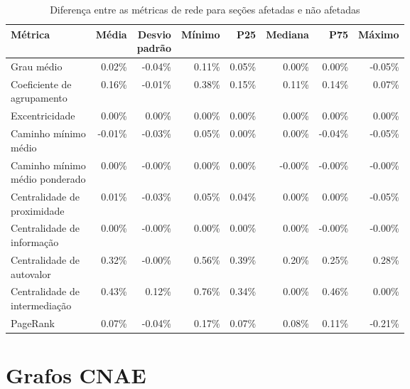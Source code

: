 \begin{table}[htb]
\centering
\caption{Diferença entre as métricas de rede para seções afetadas e não afetadas}
\label{tab:metricas-redes-pandemia:diferenca-afetadas-por-secao}
\begin{tabular}{l|rrrrrrr}
\toprule
Métrica & Média & \shortstack{Desvio\\padrão} & Mínimo & P25 & Mediana & P75 & Máximo \\
\midrule
Grau médio                     &  0.02\% & -0.04\% & 0.11\% & 0.05\% &  0.00\% &  0.00\% & -0.05\% \\ \hline
\shortstack[l]{Coeficiente de\\agrupamento}     &  0.16\% & -0.01\% & 0.38\% & 0.15\% &  0.11\% &  0.14\% &  0.07\% \\ \hline
Excentricidade                 &  0.00\% &  0.00\% & 0.00\% & 0.00\% &  0.00\% &  0.00\% &  0.00\% \\ \hline
\shortstack[l]{Caminho mínimo\\médio}           & -0.01\% & -0.03\% & 0.05\% & 0.00\% &  0.00\% & -0.04\% & -0.05\% \\ \hline
\shortstack[l]{Caminho mínimo\\médio ponderado} &  0.00\% & -0.00\% & 0.00\% & 0.00\% & -0.00\% & -0.00\% & -0.00\% \\ \hline
\shortstack[l]{Centralidade de\\proximidade}    &  0.01\% & -0.03\% & 0.05\% & 0.04\% &  0.00\% &  0.00\% & -0.05\% \\ \hline
\shortstack[l]{Centralidade de\\informação}     &  0.00\% & -0.00\% & 0.00\% & 0.00\% &  0.00\% & -0.00\% & -0.00\% \\ \hline
\shortstack[l]{Centralidade de\\autovalor}      &  0.32\% & -0.00\% & 0.56\% & 0.39\% &  0.20\% &  0.25\% &  0.28\% \\ \hline
\shortstack[l]{Centralidade de\\intermediação}  &  0.43\% &  0.12\% & 0.76\% & 0.34\% &  0.00\% &  0.46\% &  0.00\% \\ \hline
PageRank                       &  0.07\% & -0.04\% & 0.17\% & 0.07\% &  0.08\% &  0.11\% & -0.21\% \\
\bottomrule
\end{tabular}
\fdadospesquisa
\end{table}

\section{Grafos CNAE}

